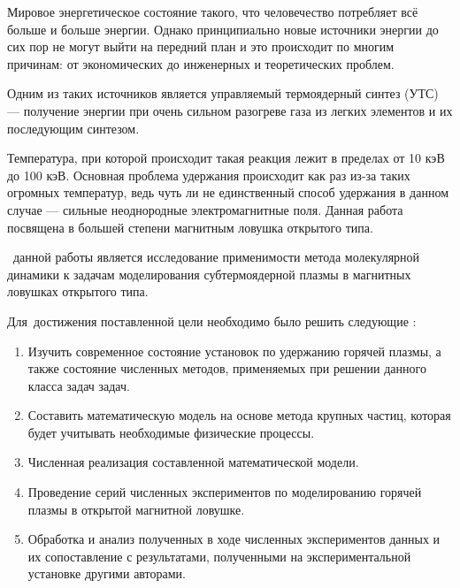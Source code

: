 {\actuality} Мировое энергетическое состояние такого, что человечество потребляет всё больше и больше энергии. Однако принципиально новые источники энергии до сих пор не могут выйти на передний план и это происходит по многим причинам: от экономических до инженерных и теоретических проблем. 

Одним из таких источников является управляемый термоядерный синтез (УТС) --- получение энергии при очень сильном разогреве газа из легких элементов и их последующим синтезом. 

Температура, при которой происходит такая реакция лежит в пределах от 10 кэВ до 100 кэВ. Основная проблема удержания происходит как раз из-за таких огромных температур, ведь чуть ли не единственный способ удержания в данном случае ---  сильные неоднородные электромагнитные поля. Данная работа посвящена в большей степени магнитным ловушка открытого типа.



\aim\ данной работы является исследование применимости метода молекулярной динамики к задачам моделирования субтермоядерной плазмы в магнитных ловушках открытого типа.

Для~достижения поставленной цели необходимо было решить следующие {\tasks}:
\begin{enumerate}
  \item Изучить современное состояние установок по удержанию горячей плазмы, а также состояние численных методов, применяемых при решении данного класса задач задач.
  \item Составить математическую модель на основе метода крупных частиц, которая будет учитывать необходимые физические процессы.
  \item Численная реализация составленной математической модели.
  \item Проведение серий численных экспериментов по моделированию горячей плазмы в открытой магнитной ловушке.
  \item Обработка и анализ полученных в ходе численных экспериментов данных и их сопоставление с результатами, полученными на экспериментальной установке другими авторами.
\end{enumerate}

